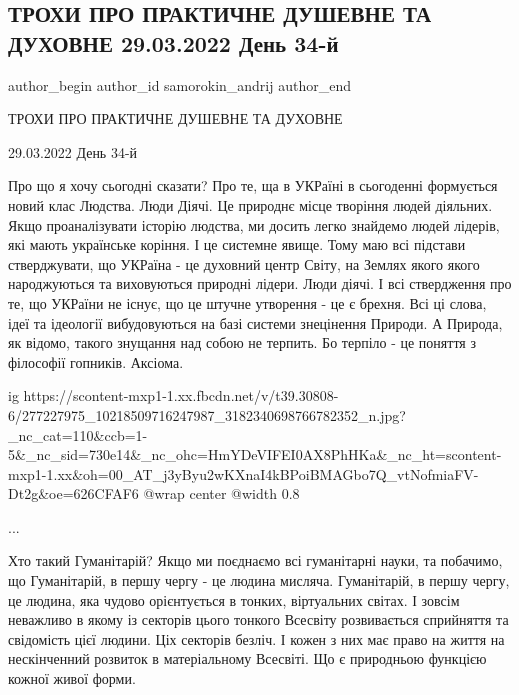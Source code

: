  
 
 
 
 
 
\subsection{ТРОХИ ПРО ПРАКТИЧНЕ ДУШЕВНЕ ТА ДУХОВНЕ 29.03.2022 День 34-й}
\label{sec:29_03_2022.fb.samorokin_andrij.1.praktychne_duhovne}
 
\ifcmt
 author_begin
   author_id samorokin_andrij
 author_end
\fi

ТРОХИ ПРО ПРАКТИЧНЕ ДУШЕВНЕ ТА ДУХОВНЕ

29.03.2022 День 34-й

Про що я хочу сьогодні сказати? Про те, ща в УКРаїні в сьогоденні формується
новий клас Людства. Люди Діячі. Це природнє місце творіння людей діяльних. Якщо
проаналізувати історію людства, ми досить легко знайдемо людей лідерів, які
мають українське коріння. І це системне явище. Тому маю всі підстави
стверджувати, що УКРаїна - це духовний центр Світу, на Землях якого якого
народжуються та виховуються природні лідери. Люди діячі. І всі ствердження про
те, що УКРаїни не існує, що це штучне утворення - це є брехня. Всі ці слова,
ідеї та ідеології вибудовуються на базі системи знецінення Природи. А Природа,
як відомо, такого знущання над собою не терпить. Бо терпіло - це поняття з
філософії гопників. Аксіома.

\ifcmt
  ig https://scontent-mxp1-1.xx.fbcdn.net/v/t39.30808-6/277227975_10218509716247987_3182340698766782352_n.jpg?_nc_cat=110&ccb=1-5&_nc_sid=730e14&_nc_ohc=HmYDeVIFEI0AX8PhHKa&_nc_ht=scontent-mxp1-1.xx&oh=00_AT_j3yByu2wKXnaI4kBPoiBMAGbo7Q_vtNofmiaFV-Dt2g&oe=626CFAF6
  @wrap center
  @width 0.8
\fi

...

Хто такий Гуманітарій? Якщо ми поєднаємо всі гуманітарні науки, та побачимо, що
Гуманітарій, в першу чергу - це людина мисляча. Гуманітарій, в першу чергу, це
людина, яка чудово орієнтується в тонких, віртуальних світах. І зовсім
неважливо в якому із секторів цього тонкого Всесвіту розвивається сприйняття та
свідомість цієї людини. Ціх секторів безліч. І кожен з них має право на життя
на нескінченний розвиток в матеріальному Всесвіті. Що є природньою функцією
кожної живої форми.


